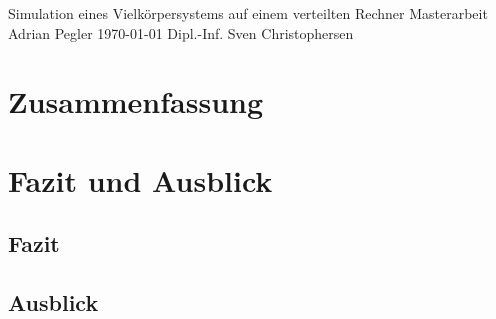 \documentclass[10pt]{book}
\begin{document}
\frontmatter
  \thesistitlepage
    {Simulation eines Vielkörpersystems auf einem verteilten Rechner}
    {Masterarbeit}%
    {Adrian Pegler}%
    {\today}%
    {Dipl.-Inf. Sven Christophersen} %

  \eidesstatt{}

  \chapter*{Zusammenfassung}
    \blindtext

  \tableofcontents{}

\mainmatter













\chapter{Fazit und Ausblick}\label{chp:Conclusions}
  \section{Fazit}
    \blindtext
  \section{Ausblick}
    \blindtext


\backmatter
  \tocbibliography
\end{document}
